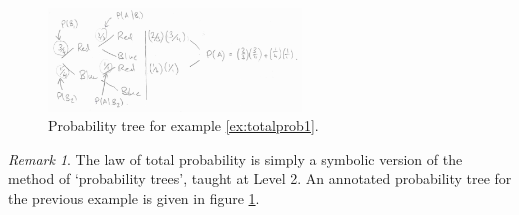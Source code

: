 \documentclass[a4paper,leqno]{article}
\numberwithin{equation}{section}
\theoremstyle{definition}
\theoremstyle{remark}
\newtheorem{rem}[equation]{Remark}
\begin{document}
\begin{figure}
  \centering
  \includegraphics[width=0.6\textwidth]{pt1}
  \caption{Probability tree for example \ref{ex:totalprob1}.\label{fig:pt1}}
\end{figure}

\begin{rem}
  The law of total probability is simply a symbolic version of the method of `probability trees', taught at Level 2. An annotated
  probability tree for the previous example is given in figure \ref{fig:pt1}.
\end{rem}
\end{document}
